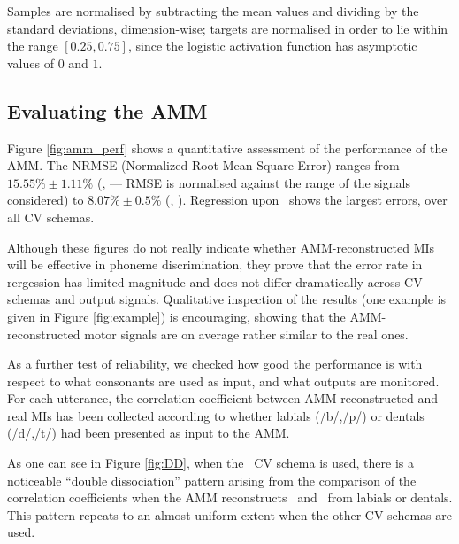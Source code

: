 Samples are normalised by subtracting the mean values
and dividing by the standard deviations, dimension-wise; targets are
normalised in order to lie within the range $[0.25,0.75]$, since the
logistic activation function has asymptotic values of $0$ and $1$.

\subsection{Evaluating the AMM}
\label{subsec:amm_results}

Figure \ref{fig:amm_perf} shows a quantitative assessment of the performance
of the AMM. The NRMSE (Normalized Root Mean Square Error) ranges from $15.55\% \pm 1.11\%$ (\vlio, \coa ---
RMSE is normalised against the range of the signals considered) to
$8.07\% \pm 0.5\%$ (\vttu, \spkc). Regression upon \vlio\ shows the largest
errors, over all CV schemas.

Although these figures do not really indicate whether AMM-reconstructed MIs will be
effective in phoneme discrimination, they prove that the error rate in rergession has
limited magnitude and does not differ dramatically across CV schemas and output signals.
Qualitative inspection of the results (one example is given in Figure \ref{fig:example})
is encouraging, showing that the AMM-reconstructed motor signals are on average rather
similar to the real ones.

As a further test of reliability, we checked how good the performance is with respect
to what consonants are used as input, and what outputs are monitored. For each utterance,
the correlation coefficient between AMM-reconstructed and real MIs has been collected
according to whether labials (/b/,/p/) or dentals (/d/,/t/) had been presented as input
to the AMM.

As one can see in Figure \ref{fig:DD}, when the \overall\ CV schema is used,
there is a noticeable ``double dissociation''
pattern arising from the comparison of the correlation coefficients when the AMM
reconstructs \vlio\ and \vttu\ from labials or dentals. This pattern repeats to an
almost uniform extent when the other CV schemas are used.

%